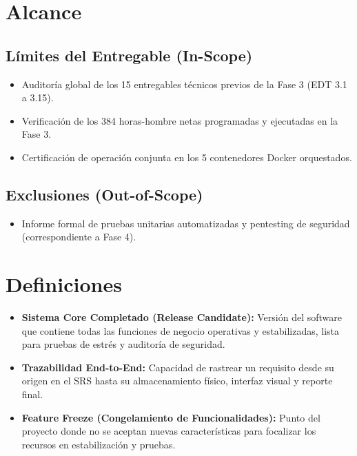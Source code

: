 \documentclass[12pt,a4paper]{article}
\begin{document}
\section{Alcance}
\subsection{Límites del Entregable (In-Scope)}
\begin{itemize}[leftmargin=1.5em, itemsep=2pt]
    \item Auditoría global de los 15 entregables técnicos previos de la Fase 3 (EDT 3.1 a 3.15).
    \item Verificación de los 384 horas-hombre netas programadas y ejecutadas en la Fase 3.
    \item Certificación de operación conjunta en los 5 contenedores Docker orquestados.
\end{itemize}
\subsection{Exclusiones (Out-of-Scope)}
\begin{itemize}[leftmargin=1.5em, itemsep=2pt]
    \item Informe formal de pruebas unitarias automatizadas y pentesting de seguridad (correspondiente a Fase 4).
\end{itemize}

\section{Definiciones}
\begin{itemize}[leftmargin=1.5em, itemsep=2pt]
    \item \textbf{Sistema Core Completado (Release Candidate):} Versión del software que contiene todas las funciones de negocio operativas y estabilizadas, lista para pruebas de estrés y auditoría de seguridad.
    \item \textbf{Trazabilidad End-to-End:} Capacidad de rastrear un requisito desde su origen en el SRS hasta su almacenamiento físico, interfaz visual y reporte final.
    \item \textbf{Feature Freeze (Congelamiento de Funcionalidades):} Punto del proyecto donde no se aceptan nuevas características para focalizar los recursos en estabilización y pruebas.
\end{itemize}
\end{document}
